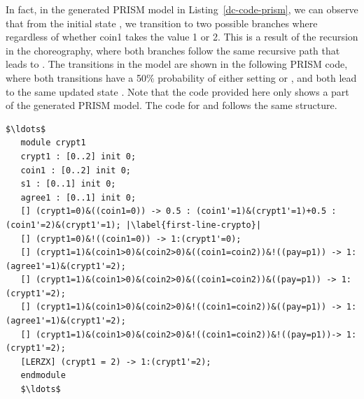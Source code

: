 In fact, in the generated PRISM model in Listing~\ref{dc-code-prism}, we can observe that from the initial state , we transition to two possible branches where  regardless of whether coin1 takes the value 1 or 2. This is a result of the recursion in the choreography, where both branches follow the same recursive path that leads to . The transitions in the model are shown in the following PRISM code, where both transitions have a 50$\%$ probability of either setting  or , and both lead to the same updated state . Note that the code provided here only shows a part of the generated PRISM model. The code for  and  follows the same structure.

\begin{lstlisting}[style=prism-color,caption={Part of the generated PRISM model for the Dining Cryptographers Protocol},captionpos=b,label={dc-code-prism},escapechar=|]
   $\ldots$
   module crypt1
   crypt1 : [0..2] init 0;
   coin1 : [0..2] init 0;
   s1 : [0..1] init 0;
   agree1 : [0..1] init 0;
   [] (crypt1=0)&((coin1=0)) -> 0.5 : (coin1'=1)&(crypt1'=1)+0.5 : (coin1'=2)&(crypt1'=1); |\label{first-line-crypto}|
   [] (crypt1=0)&!((coin1=0)) -> 1:(crypt1'=0);
   [] (crypt1=1)&(coin1>0)&(coin2>0)&((coin1=coin2))&!((pay=p1)) -> 1:(agree1'=1)&(crypt1'=2);
   [] (crypt1=1)&(coin1>0)&(coin2>0)&((coin1=coin2))&((pay=p1)) -> 1:(crypt1'=2);
   [] (crypt1=1)&(coin1>0)&(coin2>0)&!((coin1=coin2))&((pay=p1)) -> 1:(agree1'=1)&(crypt1'=2);
   [] (crypt1=1)&(coin1>0)&(coin2>0)&!((coin1=coin2))&!((pay=p1))-> 1:(crypt1'=2);
   [LERZX] (crypt1 = 2) -> 1:(crypt1'=2);
   endmodule
   $\ldots$
\end{lstlisting}


